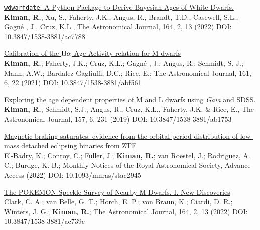 \documentclass[10pt]{cv}
\begin{document}
\begin{llist}

\begin{etaremune}
  \item \href{https://ui.adsabs.harvard.edu/abs/2022AJ....164...62K/abstract}{\texttt{wdwarfdate}: A Python Package to Derive Bayesian Ages of White Dwarfs.}\\ \textbf{Kiman, R.}, Xu, S., Faherty, J.K., Angus, R., Brandt, T.D., Casewell, S.L., Gagn\'e , J., Cruz, K.L., The Astronomical Journal, 164, 2, 13 (2022) DOI: 10.3847/1538-3881/ac7788
  \item \href{https://ui.adsabs.harvard.edu/abs/2021AJ....161..277K/abstract}{Calibration of the ${\rm H}\alpha$ Age-Activity relation for M dwarfs}\\ \textbf{Kiman, R.}; Faherty, J.K.; Cruz, K.L.; Gagn\'e , J.; Angus, R.; Schmidt, S. J.; Mann, A.W.; Bardalez Gagliuffi, D.C.; Rice, E.; The Astronomical Journal, 161, 6, 22 (2021) DOI: 10.3847/1538-3881/abf561
  \item \href{https://ui.adsabs.harvard.edu/abs/2019AJ....157..231K/abstract}{Exploring the age dependent properties of M and L dwarfs using \textit{Gaia} and SDSS.}\\ \textbf{Kiman, R.}, Schmidt, S.J., Angus, R., Cruz, K.L., Faherty, J.K. \& Rice, E., The Astronomical Journal, 157, 6, 231 (2019) DOI: 10.3847/1538-3881/ab1753 
\end{etaremune}





\begin{etaremune}

  \item \href{https://ui.adsabs.harvard.edu/abs/2022MNRAS.tmp.2758E/abstract}{Magnetic braking saturates: evidence from the orbital period distribution of low-mass detached eclipsing binaries from ZTF}\\ El-Badry, K.; Conroy, C.; Fuller, J.; \textbf{Kiman, R.}; van Roestel, J.; Rodriguez, A. C.; Burdge, K. B.; Monthly Notices of the Royal Astronomical Society, Advance Access (2022) DOI: 10.1093/mnras/stac2945
  
  \item \href{https://ui.adsabs.harvard.edu/abs/2022AJ....164...33C/abstract}{The POKEMON Speckle Survey of Nearby M Dwarfs. I. New Discoveries}\\ Clark, C. A.; van Belle, G. T.; Horch, E. P.; von Braun, K.; Ciardi, D. R.; Winters, J. G.; \textbf{Kiman, R.}; The Astronomical Journal, 164, 2, 13 (2022) DOI: 10.3847/1538-3881/ac739c 
  

\end{etaremune}
\end{llist}
\end{document}
